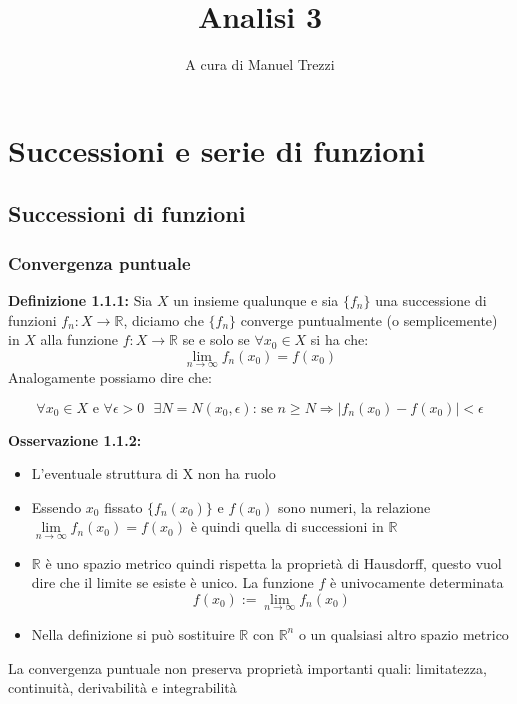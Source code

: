 \documentclass[a4paper,11pt,titlepage]{book}
\author{A cura di Manuel Trezzi}
\title{Analisi 3}
\begin{document}
\maketitle

\tableofcontents

\chapter{Successioni e serie di funzioni}

\section{Successioni di funzioni}

\subsection{Convergenza puntuale}

\textbf{Definizione 1.1.1:} Sia $X$ un insieme qualunque e sia $\{f_{n}\}$ una successione di funzioni $f_{n}:X\rightarrow\mathbb{R}$, diciamo che $\{f_{n}\}$ converge puntualmente (o semplicemente) in $X$ alla funzione $f:X\rightarrow\mathbb{R}$ se e solo se $\forall{x_{0}}\in{X}$ si ha che: 
$$\lim_{n \to \infty}{f_{n}(x_{0})}=f(x_{0})$$
Analogamente possiamo dire che:

 $$\forall{x_{0}}\in{X}\mbox{ e }\forall{\epsilon{>0}}\mbox{ }\exists{N}=N(x_{0},\epsilon)\mbox{: se }n\geq{N} \Rightarrow|f_{n}(x_{0})-f(x_{0})|<\epsilon$$ 
 
 \textbf{Osservazione 1.1.2:} \begin{itemize}
\item L'eventuale struttura di X non ha ruolo
\item Essendo $x_0$ fissato $\{f_{n}(x_0)\}$ e $f(x_0)$ sono numeri, la relazione $\lim\limits_{n\to\infty}f_n(x_0)=f(x_0)$ è quindi quella di successioni in $\mathbb{R}$
\item $\mathbb{R}$ è uno spazio metrico quindi rispetta la proprietà di Hausdorff, questo vuol dire che il limite se esiste è unico. La funzione $f$ è univocamente determinata  $$f(x_{0}):=\lim_{n \to \infty}{f_{n}}(x_{0})$$
\item Nella definizione si può sostituire $\mathbb{R}$ con $\mathbb{R}^n$ o un qualsiasi altro spazio metrico
\end{itemize}

La convergenza puntuale non preserva proprietà importanti quali:  limitatezza, continuità, derivabilità e integrabilità \\
\end{document}
